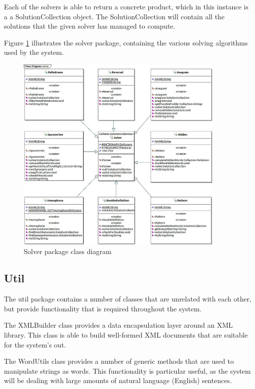 Each of the solvers is able to return a concrete product, which in this instance
is a a SolutionCollection object. The SolutionCollection will contain all the 
solutions that the given solver has managed to compute. 

Figure \ref{fig:solver_package} illustrates the solver package, containing the
various solving algorithms used by the system.

\begin{figure}[H]
  \centering
  \includegraphics[width=0.9\textwidth]{class/solver.jpg}
  \caption{Solver package class diagram}
  \label{fig:solver_package}
\end{figure}


\subsection{Util}
\label{sub:util}

The util package contains a number of classes that are unrelated with each 
other, but provide functionality that is required throughout the system.

The XMLBuilder class provides a data encapsulation layer around an XML library. 
This class is able to build well-formed XML documents that are suitable for the
system's out.

The WordUtils class provides a number of generic methods that are used to 
manipulate strings as words. This functionality is particular useful, as the 
system will be dealing with large amounts of natural language (English) 
sentences.

